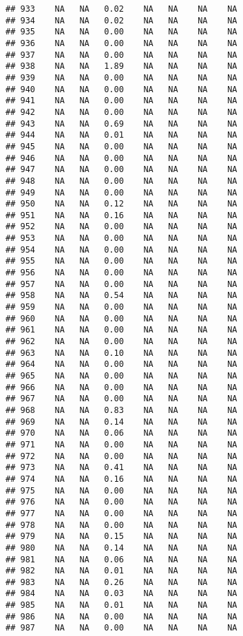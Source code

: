 \documentclass{article}\usepackage{graphicx, color}
\makeatletter
\newenvironment{kframe}{%
 \def\at@end@of@kframe{}%
 \ifinner\ifhmode%
  \def\at@end@of@kframe{\end{minipage}}%
  \begin{minipage}{\columnwidth}%
 \fi\fi%
 \def\FrameCommand##1{\hskip\@totalleftmargin \hskip-\fboxsep
 \colorbox{shadecolor}{##1}\hskip-\fboxsep
     \hskip-\linewidth \hskip-\@totalleftmargin \hskip\columnwidth}%
 \MakeFramed {\advance\hsize-\width
   \@totalleftmargin\z@ \linewidth\hsize
   \@setminipage}}%
 {\par\unskip\endMakeFramed%
 \at@end@of@kframe}
\newenvironment{knitrout}{}{} %
\makeatother
\begin{document}
\begin{knitrout}
\begin{kframe}
\begin{verbatim}
## 933    NA   NA   0.02    NA   NA    NA    NA
## 934    NA   NA   0.02    NA   NA    NA    NA
## 935    NA   NA   0.00    NA   NA    NA    NA
## 936    NA   NA   0.00    NA   NA    NA    NA
## 937    NA   NA   0.00    NA   NA    NA    NA
## 938    NA   NA   1.89    NA   NA    NA    NA
## 939    NA   NA   0.00    NA   NA    NA    NA
## 940    NA   NA   0.00    NA   NA    NA    NA
## 941    NA   NA   0.00    NA   NA    NA    NA
## 942    NA   NA   0.00    NA   NA    NA    NA
## 943    NA   NA   0.69    NA   NA    NA    NA
## 944    NA   NA   0.01    NA   NA    NA    NA
## 945    NA   NA   0.00    NA   NA    NA    NA
## 946    NA   NA   0.00    NA   NA    NA    NA
## 947    NA   NA   0.00    NA   NA    NA    NA
## 948    NA   NA   0.00    NA   NA    NA    NA
## 949    NA   NA   0.00    NA   NA    NA    NA
## 950    NA   NA   0.12    NA   NA    NA    NA
## 951    NA   NA   0.16    NA   NA    NA    NA
## 952    NA   NA   0.00    NA   NA    NA    NA
## 953    NA   NA   0.00    NA   NA    NA    NA
## 954    NA   NA   0.00    NA   NA    NA    NA
## 955    NA   NA   0.00    NA   NA    NA    NA
## 956    NA   NA   0.00    NA   NA    NA    NA
## 957    NA   NA   0.00    NA   NA    NA    NA
## 958    NA   NA   0.54    NA   NA    NA    NA
## 959    NA   NA   0.00    NA   NA    NA    NA
## 960    NA   NA   0.00    NA   NA    NA    NA
## 961    NA   NA   0.00    NA   NA    NA    NA
## 962    NA   NA   0.00    NA   NA    NA    NA
## 963    NA   NA   0.10    NA   NA    NA    NA
## 964    NA   NA   0.00    NA   NA    NA    NA
## 965    NA   NA   0.00    NA   NA    NA    NA
## 966    NA   NA   0.00    NA   NA    NA    NA
## 967    NA   NA   0.00    NA   NA    NA    NA
## 968    NA   NA   0.83    NA   NA    NA    NA
## 969    NA   NA   0.14    NA   NA    NA    NA
## 970    NA   NA   0.06    NA   NA    NA    NA
## 971    NA   NA   0.00    NA   NA    NA    NA
## 972    NA   NA   0.00    NA   NA    NA    NA
## 973    NA   NA   0.41    NA   NA    NA    NA
## 974    NA   NA   0.16    NA   NA    NA    NA
## 975    NA   NA   0.00    NA   NA    NA    NA
## 976    NA   NA   0.00    NA   NA    NA    NA
## 977    NA   NA   0.00    NA   NA    NA    NA
## 978    NA   NA   0.00    NA   NA    NA    NA
## 979    NA   NA   0.15    NA   NA    NA    NA
## 980    NA   NA   0.14    NA   NA    NA    NA
## 981    NA   NA   0.06    NA   NA    NA    NA
## 982    NA   NA   0.01    NA   NA    NA    NA
## 983    NA   NA   0.26    NA   NA    NA    NA
## 984    NA   NA   0.03    NA   NA    NA    NA
## 985    NA   NA   0.01    NA   NA    NA    NA
## 986    NA   NA   0.00    NA   NA    NA    NA
## 987    NA   NA   0.00    NA   NA    NA    NA

\end{verbatim}
\end{kframe}
\end{knitrout}
\end{document}
